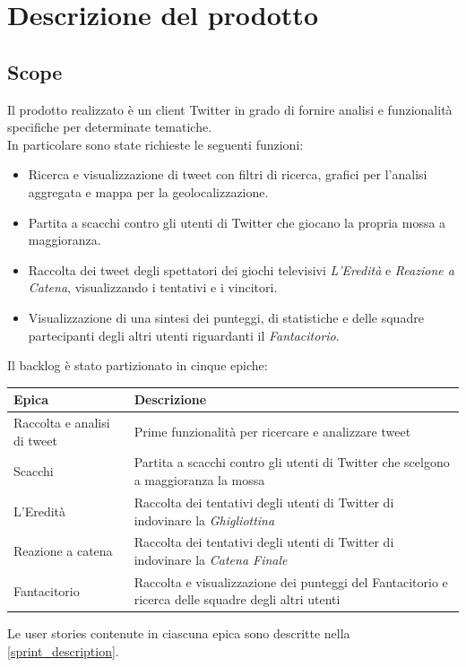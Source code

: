 \documentclass[11pt]{article}
\newcommand{\fref}[1]{\hyperref[#1]{\cref{#1}}}
\begin{document}
\tableofcontents
\newpage


\section{Descrizione del prodotto}
\subsection{Scope}
Il prodotto realizzato è un client Twitter in grado di fornire analisi e funzionalità specifiche per determinate tematiche.\\
In particolare sono state richieste le seguenti funzioni:
\begin{itemize}
    \item Ricerca e visualizzazione di tweet con filtri di ricerca, grafici per l'analisi aggregata e mappa per la geolocalizzazione.
    \item Partita a scacchi contro gli utenti di Twitter che giocano la propria mossa a maggioranza.
    \item Raccolta dei tweet degli spettatori dei giochi televisivi \textit{L'Eredità} e \textit{Reazione a Catena}, visualizzando i tentativi e i vincitori.
    \item Visualizzazione di una sintesi dei punteggi, di statistiche e delle squadre partecipanti degli altri utenti riguardanti il \textit{Fantacitorio}.
\end{itemize}

Il backlog è stato partizionato in cinque epiche:
\begin{center}
    \begin{tabular}{ | m{8em} | m{11cm} | }
        \hline
        {\textbf{Epica}} & {\textbf{Descrizione}} \\
        \hline
        Raccolta e analisi di tweet & Prime funzionalità per ricercare e analizzare tweet \\ 
        \hline
        Scacchi & Partita a scacchi contro gli utenti di Twitter che scelgono a maggioranza la mossa \\ 
        \hline
        L'Eredità & Raccolta dei tentativi degli utenti di Twitter di indovinare la \textit{Ghigliottina} \\ 
        \hline
        Reazione a catena & Raccolta dei tentativi degli utenti di Twitter di indovinare la \textit{Catena Finale} \\ 
        \hline
        Fantacitorio & Raccolta e visualizzazione dei punteggi del Fantacitorio e ricerca delle squadre degli altri utenti \\ 
        \hline
    \end{tabular}
\end{center}
Le user stories contenute in ciascuna epica sono descritte nella \fref{sprint_description}.\\~\\
\end{document}
